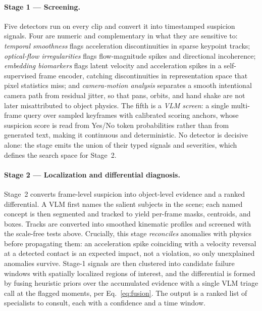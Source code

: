 \paragraph{Stage 1 --- Screening.} Five detectors run on every clip and convert it into timestamped suspicion signals. Four are numeric and complementary in what they are sensitive to: \emph{temporal smoothness} flags acceleration discontinuities in sparse keypoint tracks; \emph{optical-flow irregularities} flags flow-magnitude spikes and directional incoherence; \emph{embedding biomarkers} flags latent velocity and acceleration spikes in a self-supervised frame encoder, catching discontinuities in representation space that pixel statistics miss; and \emph{camera-motion analysis} separates a smooth intentional camera path from residual jitter, so that pans, orbits, and hand shake are not later misattributed to object physics. The fifth is a \emph{VLM screen}: a single multi-frame query over sampled keyframes with calibrated scoring anchors, whose suspicion score is read from Yes/No token probabilities rather than from generated text, making it continuous and deterministic. No detector is decisive alone: the stage emits the union of their typed signals and severities, which defines the search space for Stage~2.
 
\paragraph{Stage 2 --- Localization and differential diagnosis.} Stage~2 converts frame-level suspicion into object-level evidence and a ranked differential. A VLM first names the salient subjects in the scene; each named concept is then segmented and tracked to yield per-frame masks, centroids, and boxes. Tracks are converted into smoothed kinematic profiles and screened with the scale-free tests above. Crucially, this stage \emph{reconciles} anomalies with physics before propagating them: an acceleration spike coinciding with a velocity reversal at a detected contact is an expected impact, not a violation, so only unexplained anomalies survive. Stage-1 signals are then clustered into candidate failure windows with spatially localized regions of interest, and the differential is formed by fusing heuristic priors over the accumulated evidence with a single VLM triage call at the flagged moments, per Eq.~\ref{eq:fusion}. The output is a ranked list of specialists to consult, each with a confidence and a time window.
 
